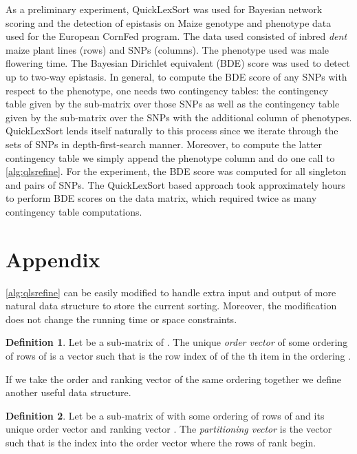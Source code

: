 \documentclass[a4paper,10pt,reqno]{amsart}
\theoremstyle{definition}
\newtheorem{definition}{Definition}
\begin{document}
As a preliminary experiment, QuickLexSort was used for Bayesian network scoring
and the detection of epistasis on Maize genotype and phenotype data
\cite{rincent2012maximizing} used for the European CornFed program. The data
used consisted of  inbred \emph{dent} maize plant lines (rows) and
 SNPs (columns). The phenotype used was male flowering time. The
Bayesian Dirichlet equivalent (BDE) \cite{heckerman1995learning} score was used
to detect up to two-way epistasis. In general, to compute the BDE score of any
 SNPs with respect to the phenotype, one needs two contingency tables: the
contingency table given by the sub-matrix over those  SNPs as well as the
contingency table given by the sub-matrix over the  SNPs with the additional
column of phenotypes. QuickLexSort lends itself naturally to this process
since we iterate through the sets of SNPs in depth-first-search manner. Moreover,
to compute the latter contingency table we simply append the phenotype column
and do one call to \autoref{alg:qlsrefine}. For the experiment, the BDE score was computed
for all singleton and pairs of SNPs. The QuickLexSort based approach took
approximately  hours to perform  BDE scores on the  data matrix, which required
twice as many contingency table computations. 










\section{Appendix}
\label{sec:appendix}
\autoref{alg:qlsrefine} can be easily modified to handle extra input and output 
of more natural data structure to store the current sorting. Moreover, the modification
does not change the running time or space constraints. 

\begin{definition}
Let  be a sub-matrix of . 
The unique \emph{order vector}  of some 
ordering  of rows of  is a vector such that
 is the row index of  of the th item in the ordering .
\end{definition}

If we take the order  and ranking vector  of the same ordering together
we define another useful data structure.

\begin{definition}
Let  be a sub-matrix of 
with some ordering  of rows of  and its unique order
vector  and ranking vector .
The \emph{partitioning vector}  is the vector such that
 is the index into the order vector  where the rows of rank 
begin.
\end{definition}
\end{document}
